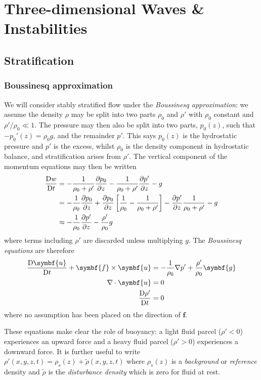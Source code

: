 \documentclass{jknotes}
\begin{document}
\section{Three-dimensional Waves \& Instabilities}
\subsection{Stratification}
\subsubsection{Boussinesq approximation}
We will consider stably stratified flow under the \emph{Boussinesq
approximation}: we assume the density $\rho$ may be split into two parts
$\rho_0$ and $\rho'$ with $\rho_0$ constant and $\rho'/\rho_0 \ll 1$. The
pressure may then also be split into two parts, $p_0(z)$, such that
$-p_0'(z) = \rho_0 g$, and the remainder $p'$. This says $p_0(z)$ is the
hydrostatic pressure and $p'$ is the excess, whilst $\rho_0$ is the density
component in hydrostatic balance, and stratification arises from $\rho'$. The
vertical component of the momentum equations may then be written
\begin{align}
	\frac{\mathrm{D} w}{\mathrm{D} t} &= -\frac{1}{\rho_0 + \rho'}\frac{\partial
		p_0}{\partial z} - \frac{1}{\rho_0 + \rho'} \frac{\partial
	p'}{\partial z} - g \\
	&= -\frac{1}{\rho_0} \frac{\partial p_0}{\partial z} + \frac{\partial
p_0}{\partial z} \left[ \frac{1}{\rho_0} - \frac{1}{\rho_0 + \rho'}\right] -
\frac{\partial p'}{\partial z} \frac{1}{\rho_0 + \rho'} - g \\
&\approx -\frac{1}{\rho_0} \frac{\partial p'}{\partial z} -
\frac{\rho'}{\rho_0} g
\end{align}
where terms including $\rho'$ are discarded unless multiplying $g$. The
\emph{Boussinesq equations} are therefore
\begin{align}
	\frac{\diffD \symbf{u}}{\diffD t} + \symbf{f} \times \symbf{u} &= -\frac{1}{\rho_0} \nabla
	p' + \frac{\rho'}{\rho_0}\symbf{g} \\
	\nabla \cdot \symbf{u} &= 0 \\
	\frac{\diffD \rho'}{\diffD t} &= 0
\end{align}
where no assumption has been placed on the direction of $\symbf{f}$. 

These equations make clear the role of buoyancy: a light fluid parcel ($\rho'
<0$) experiences an upward force and a heavy fluid parcel ($\rho' > 0$)
experiences a downward force. It is further useful to write $\rho'(x,y,z,t) =
\rho_s (z) + \tilde{\rho}(x,y,z,t)$ where $\rho_s(z)$ is a \emph{background}
or \emph{reference} density and $\tilde{\rho}$ is the \emph{disturbance
density} which is zero for fluid at rest.
\end{document}
